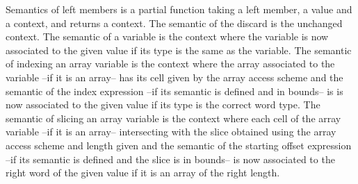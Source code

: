 \documentclass{article}
\begin{document}
\smallskip

Semantics of left members is a partial function taking a left member, a value
and a context, and returns a context.
The semantic of the discard is the unchanged context. The semantic of a variable
is the context where the variable is now associated to the given value if its
type is the same as the variable. The semantic of indexing an array variable is
the context where the array associated to the variable --if it is an array-- has
its cell given by the array access scheme and the semantic of the index
expression --if its semantic is defined and in bounds-- is is now associated to
the given value if its type is the correct word type. The semantic of slicing an
array variable is the context where each cell of the array variable --if it is
an array-- intersecting with the slice obtained using the array access scheme
and length given and the semantic of the starting offset expression --if its
semantic is defined and the slice is in bounds-- is now associated to the right
word of the given value if it is an array of the right length.

\medskip
\end{document}
